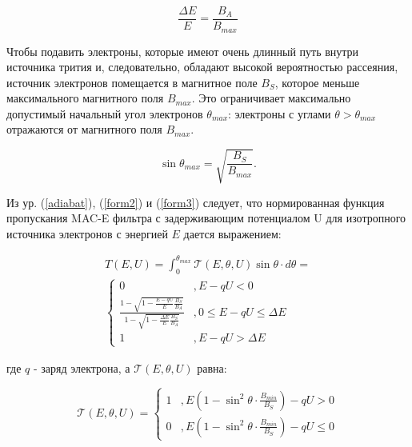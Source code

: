 ﻿\documentclass[a4paper,14pt]{extarticle}
\begin{document}
    \begin{equation}
        \label{form2}
        \frac{\Delta E}{E} = \frac{B_A}{B_{max}}
    \end{equation}
    
    Чтобы подавить электроны, которые имеют очень длинный путь внутри источника трития
    и, следовательно, обладают высокой вероятностью рассеяния, источник электронов помещается в
    магнитное поле $B_S$, которое меньше максимального магнитного поля $B_{max}$.
    Это ограничивает максимально допустимый начальный угол электронов $\theta_{max}$:
    электроны с углами $\theta > \theta_{max}$ отражаются от магнитного поля $B_{max}$.
    
    \begin{equation}
        \label{form3}
        \sin \theta_{max} = \sqrt{\frac{B_S}{B_{max}}}.
    \end{equation}
    
    Из ур. (\ref{adiabat}), (\ref{form2}) и (\ref{form3}) следует, что нормированная функция пропускания MAC-E
    фильтра с задерживающим потенциалом U для изотропного источника электронов с энергией $E$ дается выражением:
    
    \begin{equation}
    \begin{split}
      T(E,U) = \int_{0}^{\theta_{max}} \mathcal T(E, \theta, U) \sin\theta\cdot d\theta = \\
      \begin{cases} 
        0 & , E - qU < 0 \\
        \frac{1 - \sqrt{1-\frac{E-qU}{E} \frac{B_{S}}{B_{A}}}}{1 - \sqrt{1-\frac{\Delta E}{E}\frac{B_{S}}{B_{A}}}} & , 0 \leq E-qU \leq \Delta E \\
        1 & , E - qU > \Delta E
      \end{cases}
    \end{split}
    \end{equation}
    
    \noindent где $q$ - заряд электрона, а $\mathcal T(E, \theta, U)$ равна: 
    
    \begin{equation}
      \mathcal T(E, \theta, U) = 
      \begin{cases}
        1 & , E(1-\sin^2 \theta \cdot \frac{B_{min}}{B_S}) -qU > 0 \\
        0 & , E(1-\sin^2 \theta \cdot \frac{B_{min}}{B_S}) -qU \leq 0
      \end{cases}
    \end{equation}
    
\end{document}

